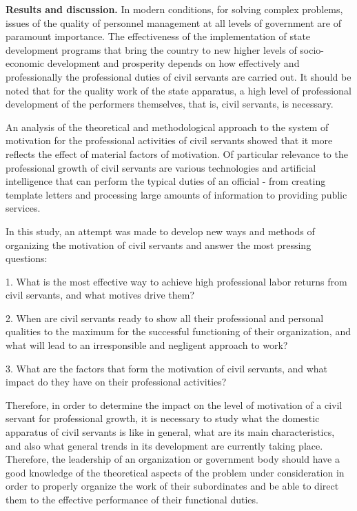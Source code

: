 \begin{multicols}{2}
{\bfseries Results and discussion.} In modern conditions, for solving
complex problems, issues of the quality of personnel management at all
levels of government are of paramount importance. The effectiveness of
the implementation of state development programs that bring the country
to new higher levels of socio-economic development and prosperity
depends on how effectively and professionally the professional duties of
civil servants are carried out. It should be noted that for the quality
work of the state apparatus, a high level of professional development of
the performers themselves, that is, civil servants, is necessary.

An analysis of the theoretical and methodological approach to the system
of motivation for the professional activities of civil servants showed
that it more reflects the effect of material factors of motivation. Of
particular relevance to the professional growth of civil servants are
various technologies and artificial intelligence that can perform the
typical duties of an official - from creating template letters and
processing large amounts of information to providing public services.

In this study, an attempt was made to develop new ways and methods of
organizing the motivation of civil servants and answer the most pressing
questions:

1. What is the most effective way to achieve high professional labor
returns from civil servants, and what motives drive them?

2. When are civil servants ready to show all their professional and
personal qualities to the maximum for the successful functioning of
their organization, and what will lead to an irresponsible and negligent
approach to work?

3. What are the factors that form the motivation of civil servants, and
what impact do they have on their professional activities?

Therefore, in order to determine the impact on the level of motivation
of a civil servant for professional growth, it is necessary to study
what the domestic apparatus of civil servants is like in general, what
are its main characteristics, and also what general trends in its
development are currently taking place. Therefore, the leadership of an
organization or government body should have a good knowledge of the
theoretical aspects of the problem under consideration in order to
properly organize the work of their subordinates and be able to direct
them to the effective performance of their functional duties.


\end{multicols}
